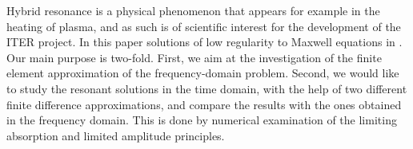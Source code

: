 Hybrid resonance is a physical phenomenon
that appears for example in the heating of plasma,
and as such is of scientific interest for the development  of  the ITER project.
In this paper  solutions of low regularity to Maxwell equations in
. 
Our main purpose is two-fold. First, we aim at the investigation of the finite element approximation 
of the frequency-domain problem. Second, we would like to study the resonant solutions 
in the time domain, with the help of two different finite difference approximations, 
and compare the results with the ones obtained in the frequency domain. This is done by  
numerical examination of the limiting absorption and limited amplitude principles. 
